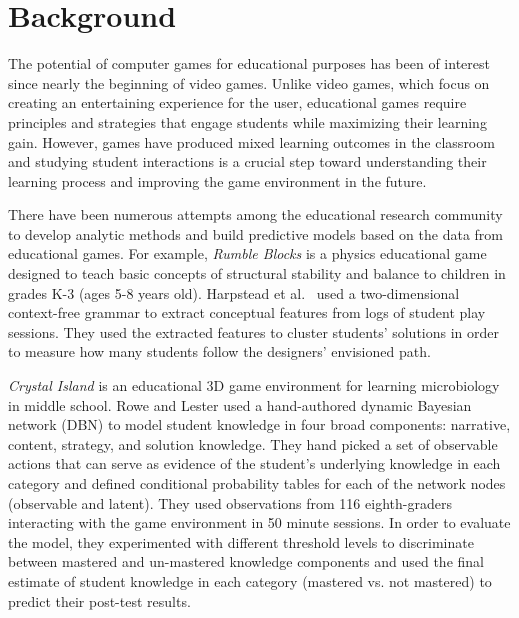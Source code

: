 \documentclass{sigchi}
\begin{document}
\section{Background}
The potential of computer games for educational purposes has been of interest since nearly the beginning of video games. Unlike video games, which focus on creating an entertaining experience for the user, educational games require principles and strategies that engage students while maximizing their learning gain. However, games have produced mixed learning outcomes in the classroom \cite{harpstead2013search,mayo2009video} and studying student interactions is a crucial step toward understanding their learning process and improving the game environment in the future.

There have been numerous attempts among the educational research community to develop analytic methods and build predictive models based on the data from educational games. For example, \textit {Rumble Blocks} \cite{christel2012rumbleblocks} is a physics educational game designed to teach basic concepts of structural stability and balance to children in grades K-3 (ages 5-8 years old). Harpstead et al.~\cite{harpstead2013investigating} used a two-dimensional context-free grammar to extract conceptual features from  logs of student play sessions. They used the extracted features to cluster students' solutions in order to measure how many students follow the designers' envisioned path.

\textit{Crystal Island} \cite{rowe2010integrating} is an educational 3D game environment for learning microbiology in middle school. 
Rowe and Lester \cite{rowe2010modeling} used a hand-authored dynamic Bayesian network (DBN) to model student knowledge in four broad components: narrative, content, strategy, and solution knowledge. 
They hand picked a set of observable actions that can serve as evidence of the student's underlying knowledge in each category and defined conditional probability tables for each of the network nodes (observable and latent).
They used observations from 116 eighth-graders interacting with the game environment in 50 minute sessions.
In order to evaluate the model, they experimented with different threshold levels to discriminate between mastered and un-mastered knowledge components and used the final estimate of student knowledge in each category (mastered vs. not mastered) to predict their post-test results.
\end{document}
